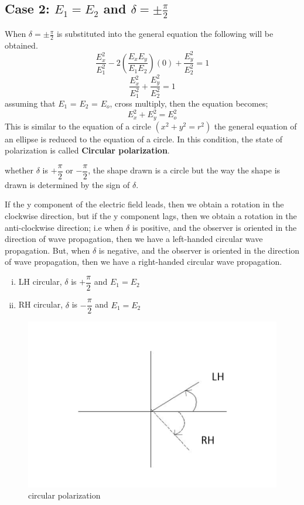 \subsection{Case 2: $ E_1 = E_2 $ and $\delta = \pm \frac{\pi}{2}$}
When $\delta = \pm \frac{\pi}{2}$ is substituted into the general equation the following will be obtained.
\begin{equation}
\frac{E_{x}^2}{E_{1}^2} -2(\frac{E_{x}E_{y}}{E_{1}E_{2}})(0) + \frac{E_{y}^2}{E_{2}^2} = 1
\end{equation}
\begin{equation}
\frac{E_{x}^2}{E_{1}^2} + \frac{E_{y}^2}{E_{2}^2} = 1
\end{equation}
assuming that $ E_1 $ = $ E_2 $ = $ E_{o} $, cross multiply, then the equation becomes;
\begin{equation}
{E_{x}^2} + {E_{y}^2} = {E_{o}^2}
\end{equation}
This is similar to the equation of a circle $(x^2 + y^2 = r^2)$ the general equation of an ellipse is reduced to the equation of a circle. In this condition, the state of polarization is called \textbf{Circular polarization}.

whether  $\delta$ is $+\dfrac{\pi}{2}$  or  $-\dfrac{\pi}{2} $, the shape drawn is a circle but the way the shape is drawn is determined by the sign of $\delta$.

If the y component of the electric field leads, then we obtain a rotation in the clockwise direction, but if the y component lags, then we obtain a rotation in the anti-clockwise direction; i.e when $\delta$ is positive, and the observer is oriented in the direction of wave propagation, then we have a left-handed circular wave propagation. But, when $\delta$ is negative, and the observer is oriented in the direction of wave propagation, then we have a right-handed circular wave propagation.
\begin{enumerate}[(i)]
\item LH circular, $\delta$ is $ +\dfrac{\pi}{2}$ and $ E_1 = E_2$
\item RH circular, $\delta$ is $-\dfrac{\pi}{2}$ and $ E_1 = E_2$ 
\end{enumerate}
\begin{figure}[h]
\centering
\includegraphics[width=.8\linewidth]{./graphics/fielddirect}
\caption{circular polarization}
\end{figure} 

